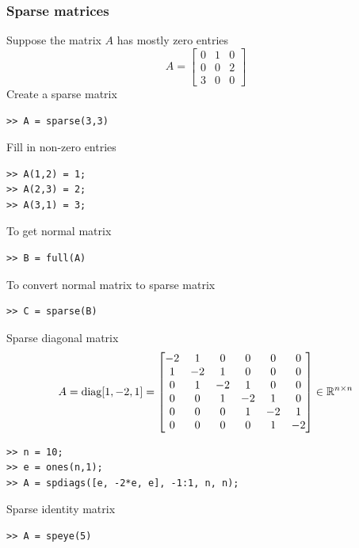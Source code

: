 \documentclass[11pt,xcolor=svgnames,onlymath]{beamer}
\begin{document}
\begin{frame}
\frametitle{Sparse matrices}
Suppose the matrix $A$ has mostly zero entries
\[
A = \begin{bmatrix}
0 & 1 & 0 \\
0 & 0 & 2 \\
3 & 0 & 0
\end{bmatrix}
\]
Create a sparse matrix
\begin{lstlisting}
>> A = sparse(3,3)
\end{lstlisting}

Fill in non-zero entries
\begin{lstlisting}
>> A(1,2) = 1;
>> A(2,3) = 2;
>> A(3,1) = 3;
\end{lstlisting}

To get normal matrix
\begin{lstlisting}
>> B = full(A)
\end{lstlisting}

To convert normal matrix to sparse matrix
\begin{lstlisting}
>> C = sparse(B)
\end{lstlisting}

Sparse diagonal matrix
\[
A = \mbox{diag}[1, -2, 1] = \begin{bmatrix}
-2 & 1 & 0 & 0 & 0 & 0 \\
1  & -2 & 1 & 0 & 0 & 0 \\
0  & 1 & -2 & 1 & 0 & 0 \\
0  & 0 & 1 & -2 & 1 & 0 \\
0  & 0 & 0 & 1 & -2 & 1 \\
0  & 0 & 0 & 0 & 1 & -2

\end{bmatrix} \in \mathbb{R}^{n \times n}
\]
\begin{lstlisting}
>> n = 10;
>> e = ones(n,1);
>> A = spdiags([e, -2*e, e], -1:1, n, n);
\end{lstlisting}

Sparse identity matrix
\begin{lstlisting}
>> A = speye(5)
\end{lstlisting}

\end{frame}
\end{document}
